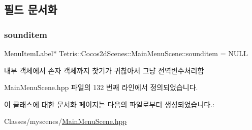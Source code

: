\subsection{필드 문서화}
\mbox{\label{class_tetris_1_1_cocos2d_scenes_1_1_main_menu_scene_a39d5adca64f40a97548344531ff019b8}} 
\subsubsection{\texorpdfstring{sounditem}{sounditem}}
{\footnotesize\ttfamily Menu\+Item\+Label$\ast$ Tetris\+::\+Cocos2d\+Scenes\+::\+Main\+Menu\+Scene\+::sounditem = N\+U\+LL\hspace{0.3cm}{\ttfamily [protected]}}



내부 객체에서 손자 객체까지 찿기가 귀찮아서 그냥 전역변수처리함 



Main\+Menu\+Scene.\+hpp 파일의 132 번째 라인에서 정의되었습니다.



이 클래스에 대한 문서화 페이지는 다음의 파일로부터 생성되었습니다.\+:\begin{DoxyCompactItemize}
\item 
Classes/myscenes/\hyperlink{_main_menu_scene_8hpp}{Main\+Menu\+Scene.\+hpp}\end{DoxyCompactItemize}
